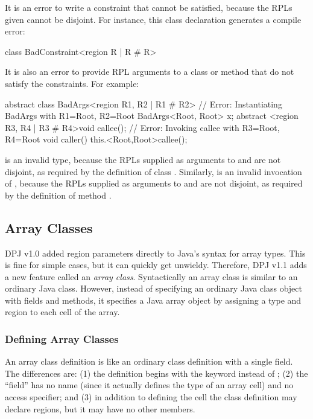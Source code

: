 It is an error to write a constraint that cannot be satisfied, because
the RPLs given cannot be disjoint.  For instance, this class
declaration generates a compile error:
%
\begin{dpjlisting}
class BadConstraint<region R | R # R> {}
\end{dpjlisting}

It is also an error to provide RPL arguments to a class or method that
do not satisfy the constraints.  For example:
%
\begin{dpjlisting}
abstract class BadArgs<region R1, R2 | R1 # R2> {
  // Error:  Instantiating BadArgs with R1=Root, R2=Root
  BadArgs<Root, Root> x;
  abstract <region R3, R4 | R3 # R4>void callee();
  // Error:  Invoking callee with R3=Root, R4=Root
  void caller() {
    this.<Root,Root>callee();
  }
}
\end{dpjlisting}
%
 is an invalid type, because the RPLs
supplied as arguments to  and  are not disjoint, as
required by the definition of class .  Similarly,
 is an invalid invocation of
, because the RPLs supplied as arguments to  and
 are not disjoint, as required by the definition of method
.

\subsection{Array Classes%
\label{sec:classes:array}}

DPJ v1.0 added region parameters directly to Java's syntax for array
types.  This is fine for simple cases, but it can quickly get
unwieldy.  Therefore, DPJ v1.1 adds a new feature called an
\emph{array class}.  Syntactically an array class is similar to an
ordinary Java class.  However, instead of specifying an ordinary Java
class object with fields and methods, it specifies a Java array object
by assigning a type and region to each cell of the array.

\subsubsection{Defining Array Classes
\label{sec:classes:array:defining}}

An array class definition is like an ordinary class definition with a
single field.  The differences are: (1) the definition begins with the
keyword  instead of ; (2) the ``field'' has
no name (since it actually defines the type of an array cell) and no
access specifier; and (3) in addition to defining the cell the class
definition may declare regions, but it may have no other members.

